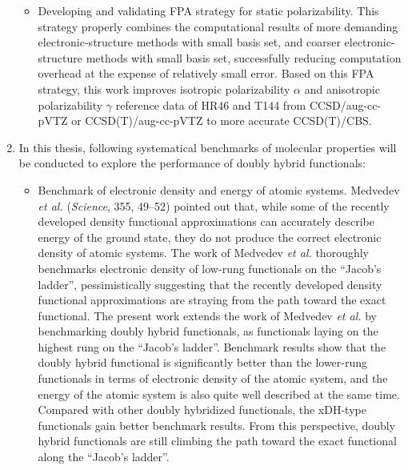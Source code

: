 \begin{abstract*}
\begin{enumerate}[nosep]
\begin{itemize}[nosep]
    \item Developing and validating FPA strategy for static polarizability. This strategy properly combines the computational results of more demanding elec\-tronic-structure methods with small basis set, and coarser electronic-struc\-ture methods with small basis set, successfully reducing computation overhead at the expense of relatively small error. Based on this FPA strategy, this work improves isotropic polarizability $\alpha$ and anisotropic polarizability $\gamma$ reference data of HR46 and T144 from CCSD/aug-cc-pVTZ or CCSD(T)/aug-cc-pVTZ to more accurate CCSD(T)/CBS.
\end{itemize}
\item In this thesis, following systematical benchmarks of molecular properties will be conducted to explore the performance of doubly hybrid functionals:
\begin{itemize}[nosep]
    \item Benchmark of electronic density and energy of atomic systems. Medvedev \textit{et al.} (\emph{Science}, 355, 49--52) pointed out that, while some of the recently developed density functional approximations can accurately describe energy of the ground state, they do not produce the correct electronic density of atomic systems. The work of Medvedev \textit{et al.} thoroughly benchmarks electronic density of low-rung functionals on the ``Jacob's ladder'', pessimistically suggesting that the recently developed density functional approximations are straying from the path toward the exact functional. The present work extends the work of Medvedev \textit{et al.} by benchmarking doubly hybrid functionals, as functionals laying on the highest rung on the ``Jacob's ladder''. Benchmark results show that the doubly hybrid functional is significantly better than the lower-rung functionals in terms of electronic density of the atomic system, and the energy of the atomic system is also quite well described at the same time. Compared with other doubly hybridized functionals, the xDH-type functionals gain better benchmark results. From this perspective, doubly hybrid functionals are still climbing the path toward the exact functional along the ``Jacob's ladder''.

\end{itemize}
\end{enumerate}
\end{abstract*}

